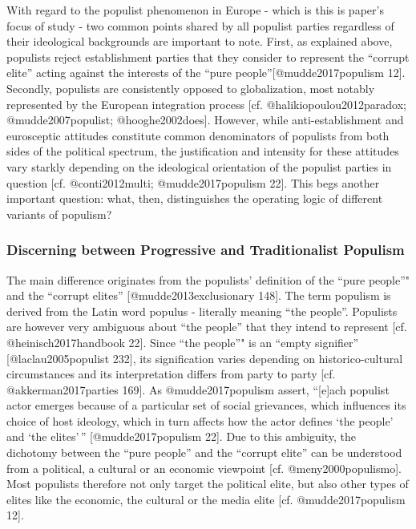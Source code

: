 \documentclass[]{article}
\begin{document}
With regard to the populist phenomenon in Europe - which is this is
paper's focus of study - two common points shared by all populist
parties regardless of their ideological backgrounds are important to
note. First, as explained above, populists reject establishment parties
that they consider to represent the ``corrupt elite'' acting against the
interests of the ``pure people''{[}@mudde2017populism 12{]}. Secondly,
populists are consistently opposed to globalization, most notably
represented by the European integration process {[}cf.
@halikiopoulou2012paradox; @mudde2007populist; @hooghe2002does{]}.
However, while anti-establishment and eurosceptic attitudes constitute
common denominators of populists from both sides of the political
spectrum, the justification and intensity for these attitudes vary
starkly depending on the ideological orientation of the populist parties
in question {[}cf. @conti2012multi; @mudde2017populism 22{]}. This begs
another important question: what, then, distinguishes the operating
logic of different variants of populism?

\subsubsection*{Discerning between Progressive and Traditionalist
Populism}\label{discerning-between-progressive-and-traditionalist-populism}

The main difference originates from the populists' definition of the
``pure people''" and the ``corrupt elites'' {[}@mudde2013exclusionary
148{]}. The term populism is derived from the Latin word populus -
literally meaning ``the people''. Populists are however very ambiguous
about ``the people'' that they intend to represent {[}cf.
@heinisch2017handbook 22{]}. Since ``the people''" is an ``empty
signifier'' {[}@laclau2005populist 232{]}, its signification varies
depending on historico-cultural circumstances and its interpretation
differs from party to party {[}cf. @akkerman2017parties 169{]}. As
@mudde2017populism assert, ``{[}e{]}ach populist actor emerges because
of a particular set of social grievances, which influences its choice of
host ideology, which in turn affects how the actor defines `the people'
and `the elites'\,'' {[}@mudde2017populism 22{]}. Due to this ambiguity,
the dichotomy between the ``pure people'' and the ``corrupt elite'' can
be understood from a political, a cultural or an economic viewpoint
{[}cf. @meny2000populismo{]}. Most populists therefore not only target
the political elite, but also other types of elites like the economic,
the cultural or the media elite {[}cf. @mudde2017populism 12{]}.
\end{document}
